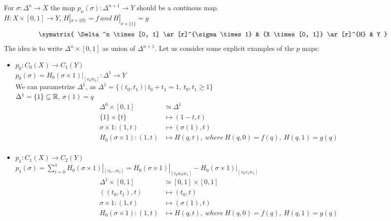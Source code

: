 \documentclass[11pt,a4paper]{report}
\begin{document}
     
        For $\sigma: \Delta^n \rightarrow X$ the map $p_n(\sigma): \Delta^{n+1} \rightarrow Y$ should be a continous map. \\
        $H: X \times [0, 1] \rightarrow Y$, $H|_{x \times \{0\}} = f \ and \ H|_{x \times \{1\}} = g $
        \[
         \xymatrix{
                        \Delta^n \times[0, 1] \ar[r]^{\sigma \times 1} & 
                        {X \times [0, 1]} \ar[r]^{H} & Y  }
        \]
        The idea is to write $\Delta^n \times[0, 1]$ as union of $\Delta^{n+1}$. 
        Let us consider some explicit examples of the $p$ maps:
        \begin{itemize}
         \item $p_0: C_0(X) \rightarrow C_1(Y)$ \\
         $p_0(\sigma) = H_0(\sigma \times 1) |_{[v_0w_0]}: \Delta^1 \rightarrow Y$ \\
         We can parametrize $\Delta^1$, as $\Delta^1 = \{ (t_0, t_1) | \ t_0 + t_1 = 1, \ t_0, t_1 \geq 1 \}$ \\
         $\Delta^1 = \{1\} \subseteq \mathbb{R}$, $\sigma(1) = q$ \\
         \begin{align*}
             \Delta^0 \times [0, 1] &\simeq \Delta^{1} \\
             \{1\} \times \{t\} &\mapsto (1-t, t) \\
             \sigma \times 1: (1, t) &\mapsto (\sigma(1), t) \\
            H_0( \sigma \times 1): (1, t) &\mapsto H(q, t), \ where \ H(q, 0) = f(q), \  H(q, 1) = g(q)\\
         \end{align*} 
         \item $p_1: C_1(X) \rightarrow C_2(Y)$ \\
         $p_1(\sigma) = \sum_{i = 0}^1 H_0(\sigma \times 1) |_{[v_0 ... w_1]} = H_0(\sigma \times 1) |_{[v_0 w_0 w_1]} - H_0(\sigma \times 1) |_{[v_0 v_1 w_1]}$ \\
         \begin{align*}
             \Delta^1 \times [0, 1] &\simeq [0, 1] \times [0, 1] \\
             ((t_0, t_1), t) &\mapsto (t_0, t) \\
             \sigma \times 1: (1, t) &\mapsto (\sigma(1), t) \\
            H_0( \sigma \times 1): (1, t) &\mapsto H(q, t), \ where \ H(q, 0) = f(q), \  H(q, 1) = g(q)\\
         \end{align*} 

\end{itemize}
\end{document}
